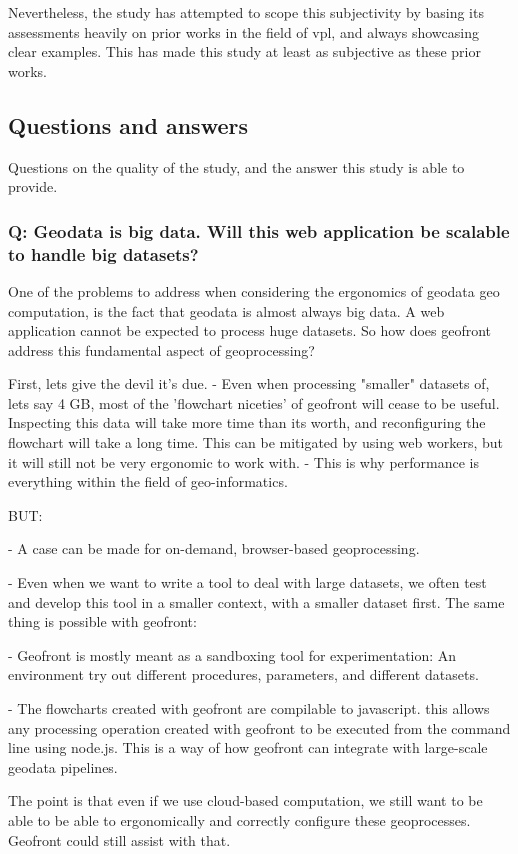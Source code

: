 Nevertheless, the study has attempted to scope this subjectivity by basing its assessments heavily on prior works in the field of vpl, and always showcasing clear examples. 
This has made this study at least as subjective as these prior works. 

\subsection*{Questions and answers}
Questions on the quality of the study, and the answer this study is able to provide.

\subsubsection*{Q: Geodata is big data. Will this web application be scalable to handle big datasets?}

One of the problems to address when considering the ergonomics of geodata geo computation, is the fact that geodata is almost always big data. 
A web application cannot be expected to process huge datasets. 
So how does geofront address this fundamental aspect of geoprocessing? 

First, lets give the devil it's due. 
- Even when processing "smaller" datasets of, lets say 4 GB, most of the 'flowchart niceties' of geofront will cease to be useful. Inspecting this data will take more time than its worth, and reconfiguring the flowchart will take a long time. This can be mitigated by using web workers, but it will still not be very ergonomic to work with. 
- This is why performance is everything within the field of geo-informatics.

\begin{note}
  BUT: 

  - A case can be made for on-demand, browser-based geoprocessing. 
  
  - Even when we want to write a tool to deal with large datasets, we often test and develop this tool in a smaller context, with a smaller dataset first. The same thing is possible with geofront: 
  
  - Geofront is mostly meant as a sandboxing tool for experimentation: An environment try out different procedures, parameters, and different datasets. 
  
  - The flowcharts created with geofront are compilable to javascript. this allows any processing operation created with geofront to be executed from the command line using node.js. This is a way of how geofront can integrate with large-scale geodata pipelines. 
  
  The point is that even if we use cloud-based computation, we still want to be able to be able to ergonomically and correctly configure these geoprocesses. Geofront could still assist with that.
  

\end{note}

